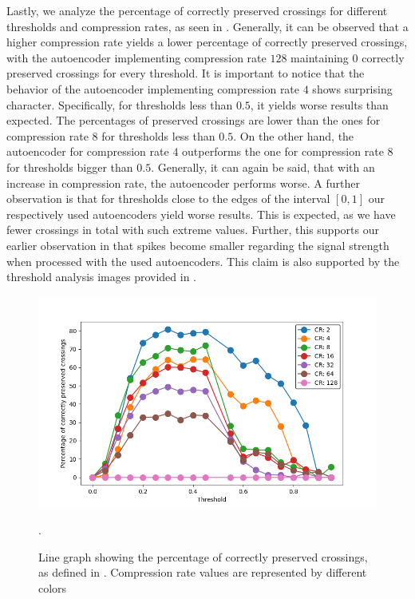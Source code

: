 \FloatBarrier

Lastly, we analyze the percentage of correctly preserved crossings for different thresholds and compression rates, as seen in .
Generally, it can be observed that a higher compression rate yields a lower percentage of correctly preserved crossings, with the autoencoder implementing compression rate $128$ maintaining $0$ correctly preserved crossings for every threshold.
It is important to notice that the behavior of the autoencoder implementing compression rate $4$ shows surprising character.
Specifically, for thresholds less than $0.5$, it yields worse results than expected.
The percentages of preserved crossings are lower than the ones for compression rate $8$ for thresholds less than $0.5$.
On the other hand, the autoencoder for compression rate $4$ outperforms the one for compression rate $8$ for thresholds bigger than $0.5$.
Generally, it can again be said, that with an increase in compression rate, the autoencoder performs worse.
A further observation is that for thresholds close to the edges of the interval $[0,1]$ our respectively used autoencoders yield worse results.
This is expected, as we have fewer crossings in total with such extreme values.
Further, this supports our earlier observation in  that spikes become smaller regarding the signal strength when processed with the used autoencoders.
This claim is also supported by the threshold analysis images provided in .

\begin{figure}[h]
	\centering
	\includegraphics[width=\linewidth]{../../Images/percentage_decoded.png}
	\caption{Line graph showing the percentage of correctly preserved crossings, as defined in . 
	Compression rate values are represented by different colors}.
	\label{fig:percentageDecodedLineChart}
\end{figure}
\FloatBarrier